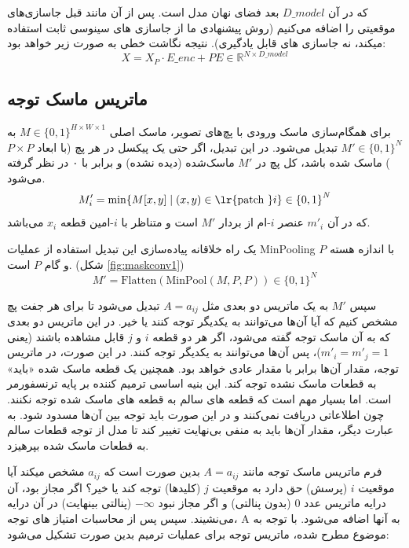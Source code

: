 که در آن $D\_{model}$ بعد فضای نهان مدل است. پس از آن مانند قبل جاسازی‌های موقعیتی را اضافه می‌کنیم (روش پیشنهادی ما از جاسازی های سینوسی ثابت استفاده میکند، نه جاسازی های قابل یادگیری).
نتیجه نگاشت خطی به صورت زیر خواهد بود:
$$
X = X_P \cdot E\_{enc} + PE \in \mathbb{R}^{N \times D\_{model}}
$$

\subsection{ماتریس ماسک توجه}


برای همگام‌سازی ماسک ورودی با پچ‌های تصویر، ماسک اصلی 
$ M \in \{0,1\}^{H \times W \times 1} $
به
$ M' \in \{0,1\}^{N} $
تبدیل می‌شود. در این تبدیل، اگر حتی یک پیکسل در هر پچ (با ابعاد \( P \times P \)) ماسک شده باشد، کل پچ در \( M' \) ماسک‌شده (دیده نشده) و برابر با ۰ در نظر گرفته می‌شود.
$$
M'_i = \min \{ M[x, y] \mid (x, y) \in \text{\lr{patch }} i \} \in {\{0,1\}}^{N}
$$
که در آن $ m'_i $ عنصر $i$-ام از بردار  $M'$ است و متناظر با $i$-امین قطعه $ x_i$  می‌باشد.

یک راه خلاقانه پیاده‌سازی این تبدیل استفاده از عملیات MinPooling با اندازه هسته $P$ و گام $P$ است. (شکل \ref{fig:maskconv1})
$$
M' = \text{Flatten}(\text{MinPool}(M, P, P)) \in {\{0,1\}}^{N}
$$


سپس $M'$ به یک ماتریس دو بعدی مثل $ A = a_{ij} $ تبدیل می‌شود تا برای هر جفت پچ مشخص کنیم که آیا آن‌ها می‌توانند به یکدیگر توجه کنند یا خیر. در این ماتریس دو بعدی که به آن ماسک توجه
گفته می‌شود، اگر هر دو قطعه \( i \) و \( j \) قابل مشاهده باشند (یعنی \( m'_i = m'_j = 1 \))، پس آن‌ها می‌توانند به یکدیگر توجه کنند. در این صورت، در ماتریس توجه، مقدار آن‌ها برابر با مقدار عادی خواهد بود. همچنین یک قطعه ماسک شده «باید» به قطعات ماسک نشده توجه کند. این بنیه اساسی ترمیم کننده بر پایه ترنسفورمر است. اما بسیار مهم است که قطعه های سالم به قطعه های ماسک شده توجه نکنند. چون اطلاعاتی دریافت نمی‌کنند و در این صورت باید توجه بین آن‌ها مسدود شود. به عبارت دیگر، مقدار آن‌ها باید به منفی بی‌نهایت تغییر کند تا مدل از توجه قطعات سالم به قطعات ماسک شده بپرهیزد.

فرم ماتریس ماسک توجه مانند $ A = a_{ij} $ بدین صورت است که $a_{ij}$ مشخص میکند آیا موقعیت $i$ (پرسش) حق دارد به موقعیت $j$ (کلیدها) توجه کند یا خیر؟ اگر مجاز بود، آن درایه ماتریس عدد 0 (بدون پنالتی) و اگر مجاز نبود $- \infty$ (پنالتی بینهایت) در آن درایه می‌نشیند. سپس پس از محاسبات امتیاز های توجه،‌ A به آنها اضافه می‌شود.
با توجه به موضوع مطرح شده، ماتریس توجه برای عملیات ترمیم بدین صورت تشکیل می‌شود:

